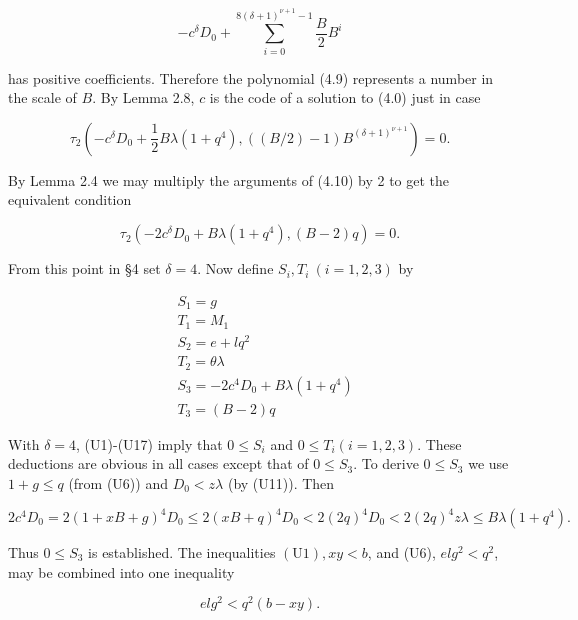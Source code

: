 \documentclass[11pt,a4paper]{article}
\begin{document}
\begin{equation*}
-c^{\delta} D_{0}+\sum_{i=0}^{8(\delta+1)^{\nu+1}-1} \frac{B}{2} B^{i} \tag{4.9}
\end{equation*}


has positive coefficients. Therefore the polynomial (4.9) represents a number in the scale of $B$. By Lemma 2.8, $c$ is the code of a solution to (4.0) just in case


\begin{equation*}
\tau_{2}\left(-c^{\delta} D_{0}+\frac{1}{2} B \lambda\left(1+q^{4}\right),((B / 2)-1) B^{(\delta+1)^{\nu+1}}\right)=0 . \tag{4.10}
\end{equation*}


By Lemma 2.4 we may multiply the arguments of (4.10) by 2 to get the equivalent condition


\begin{equation*}
\tau_{2}\left(-2 c^{\delta} D_{0}+B \lambda\left(1+q^{4}\right),(B-2) q\right)=0 . \tag{4.11}
\end{equation*}


From this point in §4 set $\delta=4$. Now define $S_{i},\allowbreak T_{i}\ (i=1,\allowbreak 2,\allowbreak 3)$ by


\begin{align*}
& S_{1}=g  \tag{U12}\\
& T_{1}=M_{1}  \tag{U13}\\
& S_{2}=e+l q^{2}  \tag{U14}\\
& T_{2}=\theta \lambda  \tag{U15}\\
& S_{3}=-2 c^{4} D_{0}+B \lambda\left(1+q^{4}\right)  \tag{U16}\\
& T_{3}=(B-2) q \tag{U17}
\end{align*}


With $\delta=4$, (U1)-(U17) imply that $0 \leq S_{i}$ and $0 \leq T_{i}(i=1,\allowbreak 2,\allowbreak 3)$. These deductions are obvious in all cases except that of $0 \leq S_{3}$. To derive $0 \leq S_{3}$ we use $1+g \leq q$ (from (U6)) and $D_{0}<z \lambda$ (by (U11)). Then

\[
2 c^{4} D_{0}=2(1+x B+g)^{4} D_{0} \leq 2(x B+q)^{4} D_{0}<2(2 q)^{4} D_{0}<2(2 q)^{4} z \lambda \leq B \lambda\left(1+q^{4}\right) .
\]

Thus $0 \leq S_{3}$ is established. The inequalities $(\mathrm{U} 1),\allowbreak  x y<b$, and (U6), $e l g^{2}<q^{2}$, may be combined into one inequality


\begin{equation*}
e l g^{2}<q^{2}(b-x y) . \tag{U6'}
\end{equation*}
\end{document}
